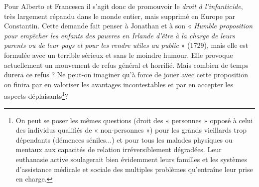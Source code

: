  Pour Alberto  et Francesca   il  s'agit donc de promouvoir le \emph{droit à l'infanticide}, très largement répandu dans le monde entier, mais supprimé en Europe par Constantin. Cette demande fait penser à Jonathan  et à son « \emph{Humble proposition pour empêcher les enfants des pauvres en Irlande d'être à la charge de leurs parents ou de leur pays et pour les rendre utiles au public} » (1729), mais elle est formulée avec un terrible sérieux et sans le moindre humour. Elle provoque actuellement un mouvement de refus général et horrifié. Mais combien de temps durera ce refus ? Ne peut-on imaginer qu'à force de jouer avec cette proposition on finira par en valoriser les avantages incontestables et par en accepter les aspects déplaisants\footnote{On peut se poser les mêmes questions (droit des « personnes » opposé à celui des individus qualifiés de « non-personnes ») pour les grands vieillards trop dépendants (démences séniles...) et pour tous les malades physiques ou mentaux aux capacités de relation irréversiblement dégradées. Leur euthanasie active soulagerait bien évidemment leurs familles et les systèmes d'assistance médicale et sociale des multiples problèmes qu'entraîne leur prise en charge.}? 
 
 
 

 
